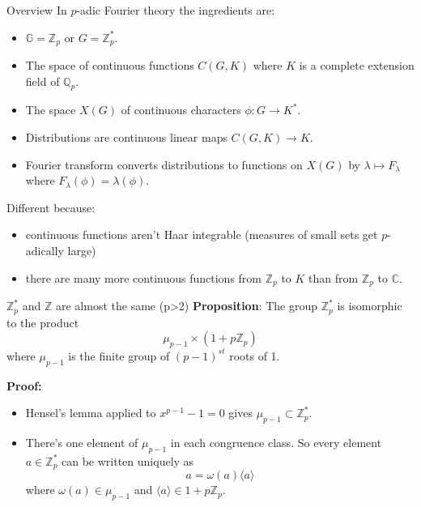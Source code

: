 \documentclass[
  ignorenonframetext,
]{beamer}
\providecommand{\tightlist}{%
  \setlength{\itemsep}{0pt}\setlength{\parskip}{0pt}}
\begin{document}
\begin{frame}{Overview}
\protect\hypertarget{overview-1}{}
In \(p\)-adic Fourier theory the ingredients are:

\begin{itemize}
\tightlist
\item
  \(\mathbb{G}=\mathbb{Z}_{p}\) or \(G=\mathbb{Z}_p^{*}\).
\item
  The space of continuous functions \(C(G,K)\) where \(K\) is a complete
  extension field of \(\mathbb{Q}_{p}\).
\item
  The space \(X(G)\) of continuous characters \(\phi: G\to K^{*}\).
\item
  Distributions are continuous linear maps \(C(G,K)\to K\).
\item
  Fourier transform converts distributions to functions on \(X(G)\) by
  \(\lambda \mapsto F_{\lambda}\) where
  \(F_{\lambda}(\phi)=\lambda(\phi)\).
\end{itemize}

Different because:

\begin{itemize}
\tightlist
\item
  continuous functions aren't Haar integrable (measures of small sets
  get \(p\)-adically large)
\item
  there are many more continuous functions from \(\mathbb{Z}_p\) to
  \(K\) than from \(\mathbb{Z}_p\) to \(\mathbb{C}\).
\end{itemize}
\end{frame}

\begin{frame}{\(\mathbb{Z}_p^{*}\) and \(\mathbb{Z}\) are almost the
same (p\textgreater2)}
\protect\hypertarget{mathbbz_p-and-mathbbz-are-almost-the-same-p2}{}
\textbf{Proposition}: The group \(\mathbb{Z}_p^{*}\) is isomorphic to
the product \[
\mu_{p-1}\times (1+p\mathbb{Z}_p)
\] where \(\mu_{p-1}\) is the finite group of \((p-1)^{st}\) roots of 1.

\textbf{Proof:}

\begin{itemize}
\tightlist
\item
  Hensel's lemma applied to \(x^{p-1}-1=0\) gives
  \(\mu_{p-1}\subset\mathbb{Z}_{p}^{*}\).
\item
  There's one element of \(\mu_{p-1}\) in each congruence class. So
  every element \(a\in\mathbb{Z}_{p}^{*}\) can be written uniquely as \[
  a=\omega(a)\langle a\rangle
  \] where \(\omega(a)\in\mu_{p-1}\) and
  \(\langle a \rangle \in 1+p\mathbb{Z}_{p}\).
\end{itemize}
\end{frame}
\end{document}
